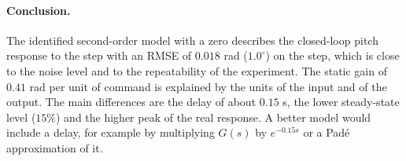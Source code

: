 \paragraph{Conclusion.}
The identified second-order model with a zero describes the closed-loop pitch response to the step with an RMSE of $0.018$ rad ($1.0^\circ$) on the step, which is close to the noise level and to the repeatability of the experiment.
The static gain of $0.41$ rad per unit of command is explained by the units of the input and of the output.
The main differences are the delay of about $0.15$ s, the lower steady-state level ($15\%$) and the higher peak of the real response.
A better model would include a delay, for example by multiplying $G(s)$ by $e^{-0.15 s}$ or a Pad\'e approximation of it.
